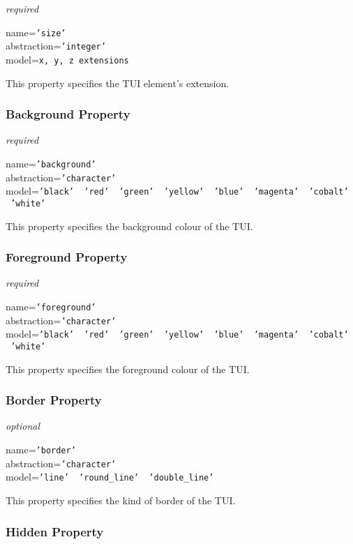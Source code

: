 \emph{required}

name=\texttt{'size'}\\
abstraction=\texttt{'integer'}\\
model=\texttt{x, y, z extensions}

This property specifies the TUI element's extension.

\subsubsection{Background Property}

\emph{required}

name=\texttt{'background'}\\
abstraction=\texttt{'character'}\\
model=\texttt{'black' \vline\ 'red' \vline\ 'green' \vline\ 'yellow' \vline\ 'blue' \vline\ 'magenta' \vline\ 'cobalt' \vline\ 'white'}

This property specifies the background colour of the TUI.

\subsubsection{Foreground Property}

\emph{required}

name=\texttt{'foreground'}\\
abstraction=\texttt{'character'}\\
model=\texttt{'black' \vline\ 'red' \vline\ 'green' \vline\ 'yellow' \vline\ 'blue' \vline\ 'magenta' \vline\ 'cobalt' \vline\ 'white'}

This property specifies the foreground colour of the TUI.

\subsubsection{Border Property}

\emph{optional}

name=\texttt{'border'}\\
abstraction=\texttt{'character'}\\
model=\texttt{'line' \vline\ 'round\_line' \vline\ 'double\_line'}

This property specifies the kind of border of the TUI.

\subsubsection{Hidden Property}

